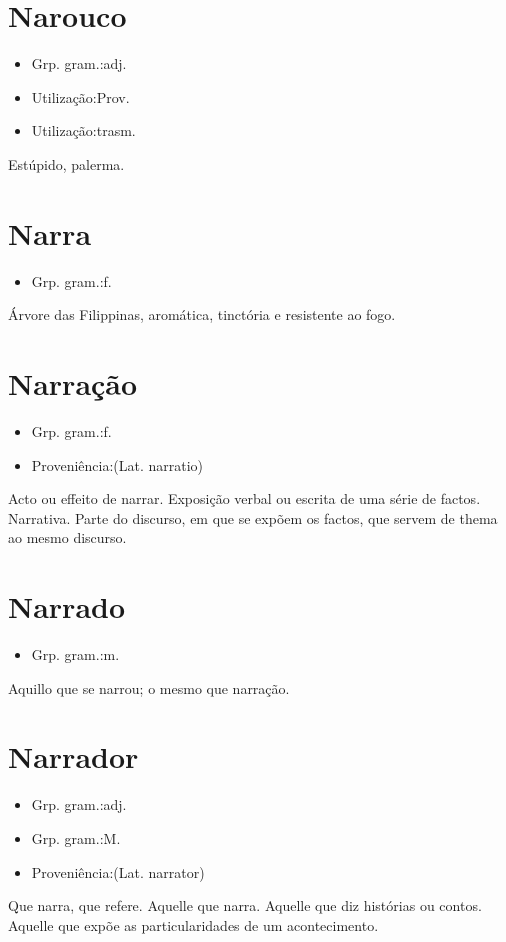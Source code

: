 \section{Narouco}
\begin{itemize}
\item {Grp. gram.:adj.}
\end{itemize}
\begin{itemize}
\item {Utilização:Prov.}
\end{itemize}
\begin{itemize}
\item {Utilização:trasm.}
\end{itemize}
Estúpido, palerma.
\section{Narra}
\begin{itemize}
\item {Grp. gram.:f.}
\end{itemize}
Árvore das Filippinas, aromática, tinctória e resistente ao fogo.
\section{Narração}
\begin{itemize}
\item {Grp. gram.:f.}
\end{itemize}
\begin{itemize}
\item {Proveniência:(Lat. \textunderscore narratio\textunderscore )}
\end{itemize}
Acto ou effeito de narrar.
Exposição verbal ou escrita de uma série de factos.
Narrativa.
Parte do discurso, em que se expõem os factos, que servem de thema ao mesmo discurso.
\section{Narrado}
\begin{itemize}
\item {Grp. gram.:m.}
\end{itemize}
Aquillo que se narrou; o mesmo que \textunderscore narração\textunderscore .
\section{Narrador}
\begin{itemize}
\item {Grp. gram.:adj.}
\end{itemize}
\begin{itemize}
\item {Grp. gram.:M.}
\end{itemize}
\begin{itemize}
\item {Proveniência:(Lat. \textunderscore narrator\textunderscore )}
\end{itemize}
Que narra, que refere.
Aquelle que narra.
Aquelle que diz histórias ou contos.
Aquelle que expõe as particularidades de um acontecimento.
